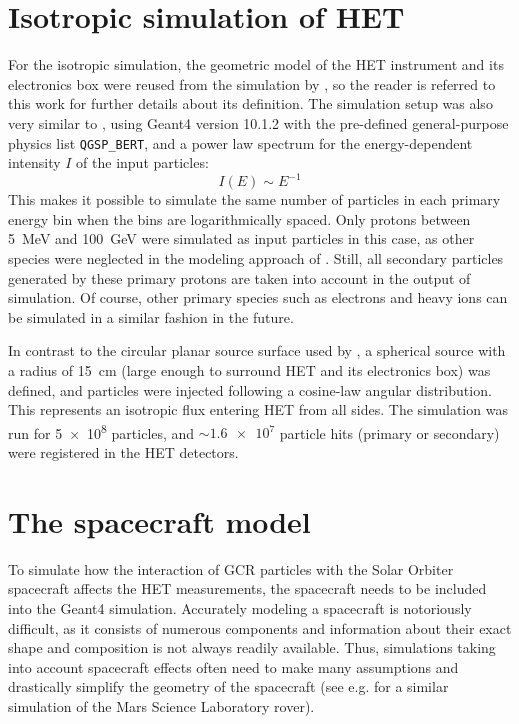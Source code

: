 \section{Isotropic simulation of HET}
\label{sec:isotropic_sim}

For the isotropic simulation, the geometric model of the HET instrument and its electronics box were reused from the simulation by \citet{Elftmann-2020-PhD}, so the reader is referred to this work for further details about its definition. The simulation setup was also very similar to \citet{Elftmann-2020-PhD}, using Geant4 version 10.1.2 with the pre-defined general-purpose physics list \texttt{QGSP\_BERT}, and a power law spectrum for the energy-dependent intensity $I$ of the input particles:
\begin{equation}
I(E) \sim E^{-1}
\end{equation}
This makes it possible to simulate the same number of particles in each primary energy bin when the bins are logarithmically spaced. Only protons between \SI{5}{\mega\electronvolt} and \SI{100}{\giga\electronvolt} were simulated as input particles in this case, as other species were neglected in the modeling approach of \citet{Forstner-2021-SolO}. Still, all secondary particles generated by these primary protons are taken into account in the output of simulation. Of course, other primary species such as electrons and heavy ions can be simulated in a similar fashion in the future.

In contrast to the circular planar source surface used by \citet{Elftmann-2020-PhD}, a spherical source with a radius of \SI{15}{\centi\meter} (large enough to surround HET and its electronics box) was defined, and particles were injected following a cosine-law angular distribution. This represents an isotropic flux entering HET from all sides.
The simulation was run for \num{5e8} particles, and $\sim\num{1.6e7}$ particle hits (primary or secondary) were registered in the HET detectors.

\section{The spacecraft model}
\label{sec:spacecraft_model}

To simulate how the interaction of GCR particles with the Solar Orbiter spacecraft affects the HET measurements, the spacecraft needs to be included into the Geant4 simulation. Accurately modeling a spacecraft is notoriously difficult, as it consists of numerous components and information about their exact shape and composition is not always readily available. Thus, simulations taking into account spacecraft effects often need to make many assumptions and drastically simplify the geometry of the spacecraft (see e.g. \citet{Appel-2018-PhD,Appel-2018} for a similar simulation of the Mars Science Laboratory rover).

